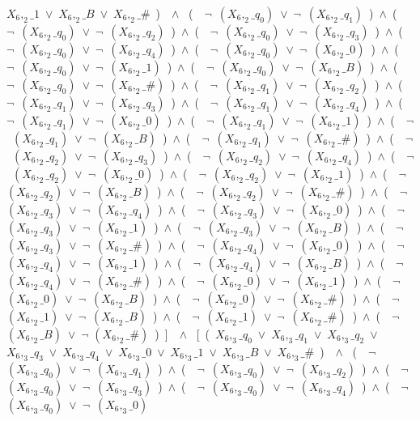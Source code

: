 ﻿\documentclass[a4paper,10pt]{article}
\begin{document}
$X_6,_2\_1$\ $\vee$\ $X_6,_2\_B$\ $\vee$\ $X_6,_2\_\#$\ )\ \ $\wedge$ \ (\ \ $\neg$\ $(X_6,_2\_q_0)$\ $\vee$\ $\neg$\ $(X_6,_2\_q_1)$\ )\ $\wedge$\ (\ \ $\neg$\ $(X_6,_2\_q_0)$\ $\vee$\ $\neg$\ $(X_6,_2\_q_2)$\ )\ $\wedge$\ (\ \ $\neg$\ $(X_6,_2\_q_0)$\ $\vee$\ $\neg$\ $(X_6,_2\_q_3)$\ )\ $\wedge$\ (\ \ $\neg$\ $(X_6,_2\_q_0)$\ $\vee$\ $\neg$\ $(X_6,_2\_q_4)$\ )\ $\wedge$\ (\ \ $\neg$\ $(X_6,_2\_q_0)$\ $\vee$\ $\neg$\ $(X_6,_2\_0)$\ )\ $\wedge$\ (\ \ $\neg$\ $(X_6,_2\_q_0)$\ $\vee$\ $\neg$\ $(X_6,_2\_1)$\ )\ $\wedge$\ (\ \ $\neg$\ $(X_6,_2\_q_0)$\ $\vee$\ $\neg$\ $(X_6,_2\_B)$\ )\ $\wedge$\ (\ \ $\neg$\ $(X_6,_2\_q_0)$\ $\vee$\ $\neg$\ $(X_6,_2\_\#)$\ )\ $\wedge$\ (\ \ $\neg$\ $(X_6,_2\_q_1)$\ $\vee$\ $\neg$\ $(X_6,_2\_q_2)$\ )\ $\wedge$\ (\ \ $\neg$\ $(X_6,_2\_q_1)$\ $\vee$\ $\neg$\ $(X_6,_2\_q_3)$\ )\ $\wedge$\ (\ \ $\neg$\ $(X_6,_2\_q_1)$\ $\vee$\ $\neg$\ $(X_6,_2\_q_4)$\ )\ $\wedge$\ (\ \ $\neg$\ $(X_6,_2\_q_1)$\ $\vee$\ $\neg$\ $(X_6,_2\_0)$\ )\ $\wedge$\ (\ \ $\neg$\ $(X_6,_2\_q_1)$\ $\vee$\ $\neg$\ $(X_6,_2\_1)$\ )\ $\wedge$\ (\ \ $\neg$\ $(X_6,_2\_q_1)$\ $\vee$\ $\neg$\ $(X_6,_2\_B)$\ )\ $\wedge$\ (\ \ $\neg$\ $(X_6,_2\_q_1)$\ $\vee$\ $\neg$\ $(X_6,_2\_\#)$\ )\ $\wedge$\ (\ \ $\neg$\ $(X_6,_2\_q_2)$\ $\vee$\ $\neg$\ $(X_6,_2\_q_3)$\ )\ $\wedge$\ (\ \ $\neg$\ $(X_6,_2\_q_2)$\ $\vee$\ $\neg$\ $(X_6,_2\_q_4)$\ )\ $\wedge$\ (\ \ $\neg$\ $(X_6,_2\_q_2)$\ $\vee$\ $\neg$\ $(X_6,_2\_0)$\ )\ $\wedge$\ (\ \ $\neg$\ $(X_6,_2\_q_2)$\ $\vee$\ $\neg$\ $(X_6,_2\_1)$\ )\ $\wedge$\ (\ \ $\neg$\ $(X_6,_2\_q_2)$\ $\vee$\ $\neg$\ $(X_6,_2\_B)$\ )\ $\wedge$\ (\ \ $\neg$\ $(X_6,_2\_q_2)$\ $\vee$\ $\neg$\ $(X_6,_2\_\#)$\ )\ $\wedge$\ (\ \ $\neg$\ $(X_6,_2\_q_3)$\ $\vee$\ $\neg$\ $(X_6,_2\_q_4)$\ )\ $\wedge$\ (\ \ $\neg$\ $(X_6,_2\_q_3)$\ $\vee$\ $\neg$\ $(X_6,_2\_0)$\ )\ $\wedge$\ (\ \ $\neg$\ $(X_6,_2\_q_3)$\ $\vee$\ $\neg$\ $(X_6,_2\_1)$\ )\ $\wedge$\ (\ \ $\neg$\ $(X_6,_2\_q_3)$\ $\vee$\ $\neg$\ $(X_6,_2\_B)$\ )\ $\wedge$\ (\ \ $\neg$\ $(X_6,_2\_q_3)$\ $\vee$\ $\neg$\ $(X_6,_2\_\#)$\ )\ $\wedge$\ (\ \ $\neg$\ $(X_6,_2\_q_4)$\ $\vee$\ $\neg$\ $(X_6,_2\_0)$\ )\ $\wedge$\ (\ \ $\neg$\ $(X_6,_2\_q_4)$\ $\vee$\ $\neg$\ $(X_6,_2\_1)$\ )\ $\wedge$\ (\ \ $\neg$\ $(X_6,_2\_q_4)$\ $\vee$\ $\neg$\ $(X_6,_2\_B)$\ )\ $\wedge$\ (\ \ $\neg$\ $(X_6,_2\_q_4)$\ $\vee$\ $\neg$\ $(X_6,_2\_\#)$\ )\ $\wedge$\ (\ \ $\neg$\ $(X_6,_2\_0)$\ $\vee$\ $\neg$\ $(X_6,_2\_1)$\ )\ $\wedge$\ (\ \ $\neg$\ $(X_6,_2\_0)$\ $\vee$\ $\neg$\ $(X_6,_2\_B)$\ )\ $\wedge$\ (\ \ $\neg$\ $(X_6,_2\_0)$\ $\vee$\ $\neg$\ $(X_6,_2\_\#)$\ )\ $\wedge$\ (\ \ $\neg$\ $(X_6,_2\_1)$\ $\vee$\ $\neg$\ $(X_6,_2\_B)$\ )\ $\wedge$\ (\ \ $\neg$\ $(X_6,_2\_1)$\ $\vee$\ $\neg$\ $(X_6,_2\_\#)$\ )\ $\wedge$\ (\ \ $\neg$ $(X_6,_2\_B)$\ $\vee$\ $\neg$ $(X_6,_2\_\#)$\ )\ ]\ \ $\wedge$ \ [\ (\ $X_6,_3\_q_0$\ $\vee$\ $X_6,_3\_q_1$\ $\vee$\ $X_6,_3\_q_2$\ $\vee$\ $X_6,_3\_q_3$\ $\vee$\ $X_6,_3\_q_4$\ $\vee$\ $X_6,_3\_0$\ $\vee$\ $X_6,_3\_1$\ $\vee$\ $X_6,_3\_B$\ $\vee$\ $X_6,_3\_\#$\ )\ \ $\wedge$ \ (\ \ $\neg$\ $(X_6,_3\_q_0)$\ $\vee$\ $\neg$\ $(X_6,_3\_q_1)$\ )\ $\wedge$\ (\ \ $\neg$\ $(X_6,_3\_q_0)$\ $\vee$\ $\neg$\ $(X_6,_3\_q_2)$\ )\ $\wedge$\ (\ \ $\neg$\ $(X_6,_3\_q_0)$\ $\vee$\ $\neg$\ $(X_6,_3\_q_3)$\ )\ $\wedge$\ (\ \ $\neg$\ $(X_6,_3\_q_0)$\ $\vee$\ $\neg$\ $(X_6,_3\_q_4)$\ )\ $\wedge$\ (\ \ $\neg$\ $(X_6,_3\_q_0)$\ $\vee$\ $\neg$\ $(X_6,_3\_0)$\ 
\end{document}
